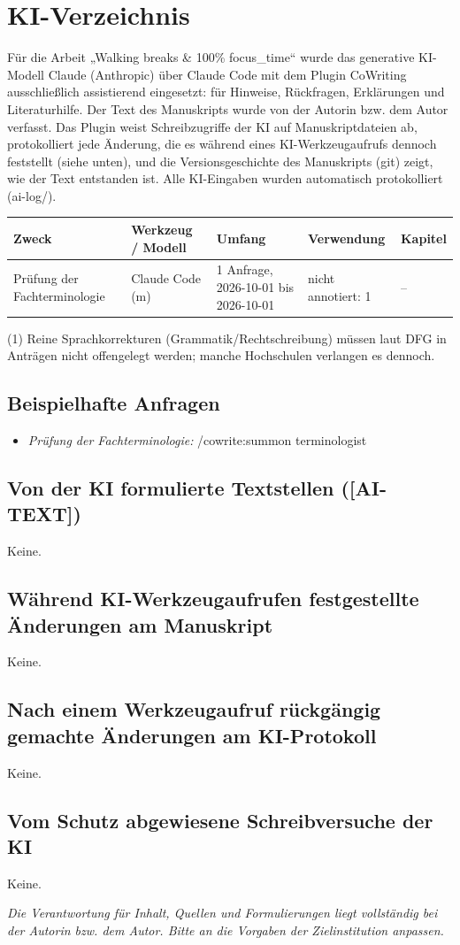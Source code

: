 \section*{KI-Verzeichnis}

Für die Arbeit „Walking breaks \& 100\% focus\_time“ wurde das generative KI-Modell Claude (Anthropic) über Claude Code mit dem Plugin CoWriting ausschließlich assistierend eingesetzt: für Hinweise, Rückfragen, Erklärungen und Literaturhilfe. Der Text des Manuskripts wurde von der Autorin bzw. dem Autor verfasst. Das Plugin weist Schreibzugriffe der KI auf Manuskriptdateien ab, protokolliert jede Änderung, die es während eines KI-Werkzeugaufrufs dennoch feststellt (siehe unten), und die Versionsgeschichte des Manuskripts (git) zeigt, wie der Text entstanden ist. Alle KI-Eingaben wurden automatisch protokolliert (ai-log/).

\begin{tabular}{p{.22\linewidth}p{.18\linewidth}p{.2\linewidth}p{.2\linewidth}p{.1\linewidth}}
\hline
\textbf{Zweck} & \textbf{Werkzeug / Modell} & \textbf{Umfang} & \textbf{Verwendung} & \textbf{Kapitel} \\
\hline
Prüfung der Fachterminologie & Claude Code (m) & 1 Anfrage, 2026-10-01 bis 2026-10-01 & nicht annotiert: 1 & – \\
\hline
\end{tabular}

\noindent(1) Reine Sprachkorrekturen (Grammatik/Rechtschreibung) müssen laut DFG in Anträgen nicht offengelegt werden; manche Hochschulen verlangen es dennoch.

\subsection*{Beispielhafte Anfragen}
\begin{itemize}
  \item \textit{Prüfung der Fachterminologie:} /cowrite:summon terminologist
\end{itemize}
\subsection*{Von der KI formulierte Textstellen ([AI-TEXT])}
Keine.
\subsection*{Während KI-Werkzeugaufrufen festgestellte Änderungen am Manuskript}
Keine.
\subsection*{Nach einem Werkzeugaufruf rückgängig gemachte Änderungen am KI-Protokoll}
Keine.
\subsection*{Vom Schutz abgewiesene Schreibversuche der KI}
Keine.

\textit{Die Verantwortung für Inhalt, Quellen und Formulierungen liegt vollständig bei der Autorin bzw. dem Autor. Bitte an die Vorgaben der Zielinstitution anpassen.}
